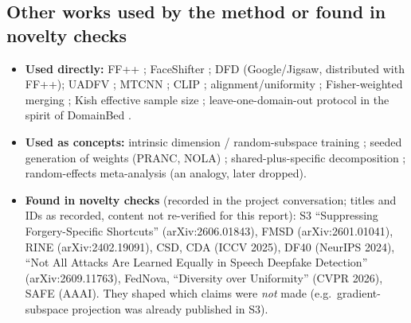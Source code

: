 \documentclass[10pt,a4paper]{article}
\begin{document}
\subsection{Other works used by the method or found in novelty checks}
\begin{itemize}
\item \textbf{Used directly:} FF++ \cite{rossler2019ffpp}; FaceShifter \cite{li2020faceshifter};
DFD (Google/Jigsaw, distributed with FF++); UADFV \cite{yang2019uadfv}; MTCNN
\cite{zhang2016mtcnn}; CLIP \cite{radford2021clip}; alignment/uniformity \cite{wang2020alignment};
Fisher-weighted merging \cite{matena2022fisher}; Kish effective sample size \cite{kish1965};
leave-one-domain-out protocol in the spirit of DomainBed \cite{gulrajani2021domainbed}.
\item \textbf{Used as concepts:} intrinsic dimension / random-subspace training
\cite{li2018intrinsic,aghajanyan2021intrinsic}; seeded generation of weights (PRANC, NOLA)
\cite{nooralinejad2023pranc,koohpayegani2024nola}; shared-plus-specific decomposition
\cite{khosla2012undoing,evgeniou2004multitask,piratla2020csd}; random-effects meta-analysis
\cite{dersimonian1986meta} (an analogy, later dropped).
\item \textbf{Found in novelty checks} (recorded in the project conversation; titles and IDs as
recorded, content not re-verified for this report): S3 ``Suppressing Forgery-Specific Shortcuts''
(arXiv:2606.01843), FMSD (arXiv:2601.01041), RINE (arXiv:2402.19091), CSD, CDA (ICCV 2025), DF40
(NeurIPS 2024), ``Not All Attacks Are Learned Equally in Speech Deepfake Detection''
(arXiv:2609.11763), FedNova, ``Diversity over Uniformity'' (CVPR 2026), SAFE (AAAI). They shaped
which claims were \emph{not} made (e.g.\ gradient-subspace projection was already published in S3).
\end{itemize}
\end{document}
